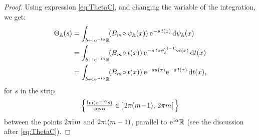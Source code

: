 \documentclass[10pt,a4paper]{amsart}
\newcommand{\R}{{\mathbb R}}
\newcommand{\e}{\ensuremath{\mkern.25\thinmuskip\mathrm{e}\mkern.4\thinmuskip}}
\newcommand{\im}{\operatorname{Im}}
\newcommand{\orbit}{\mathbb{A}}
\renewcommand{\d}{\ensuremath{\operatorname{d}\!}}
\renewcommand{\i}{\mathrm{i}\mkern.25\thinmuskip}
\begin{document}
\begin{proof}
Using expression \eqref{eq:ThetaC}, and changing the variable of the integration, we get:
\begin{equation}\label{eq:ThetaD}
\begin{aligned}
	\Theta_\orbit(s)&=\int_{b+\i \e^{-\i\alpha}\R}\!(B_m\!\circ\psi_\orbit(x))\,\e^{-s\,t(x)}\d\psi_\orbit(x)\\
	&=\int_{b+\i \e^{-\i\alpha}\R}\!(B_m\!\circ t(x))\,\e^{-s\,t\circ\psi_\orbit^{\circ(-1)}\!\circ t(x)}\d t(x)\\
	&=\int_{b+\i \e^{-\i\alpha}\R}\!(B_m\!\circ t(x))\,\e^{-su(x)}\e^{-s\,t(x)}\d t(x),
\end{aligned}
\end{equation}
for $s$ in the strip
\begin{equation}\label{eq:strip}
\Big\{\tfrac{\im(\e^{-\i \alpha}s)}{\cos\alpha}\in\ ]2\pi(m\!-\!1),\, 2\pi m[\,\Big\}\end{equation} 
between the points $2\pi\i m$ and $2\pi\i(m-1)$, parallel to $\e^{\i\alpha}\R$ (see the discussion after \eqref{eq:ThetaC}).


\end{proof}
\end{document}
